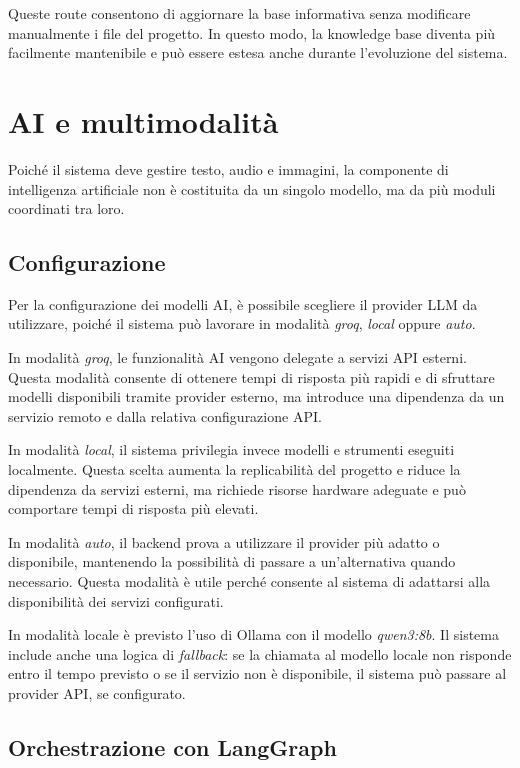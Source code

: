 Queste route consentono di aggiornare la base informativa senza modificare manualmente i file del progetto. In questo modo, la knowledge base diventa più facilmente mantenibile e può essere estesa anche durante l’evoluzione del sistema.

\section{AI e multimodalità}

Poiché il sistema deve gestire testo, audio e immagini, la componente di intelligenza artificiale non è costituita da un singolo modello, ma da più moduli coordinati tra loro.

\subsection*{Configurazione}

Per la configurazione dei modelli AI, è possibile scegliere il provider LLM da utilizzare, poiché il sistema può lavorare in modalità \textit{groq}, \textit{local} oppure \textit{auto}.

In modalità \textit{groq}, le funzionalità AI vengono delegate a servizi API esterni. Questa modalità consente di ottenere tempi di risposta più rapidi e di sfruttare modelli disponibili tramite provider esterno, ma introduce una dipendenza da un servizio remoto e dalla relativa configurazione API.

In modalità \textit{local}, il sistema privilegia invece modelli e strumenti eseguiti localmente. Questa scelta aumenta la replicabilità del progetto e riduce la dipendenza da servizi esterni, ma richiede risorse hardware adeguate e può comportare tempi di risposta più elevati.

In modalità \textit{auto}, il backend prova a utilizzare il provider più adatto o disponibile, mantenendo la possibilità di passare a un’alternativa quando necessario. Questa modalità è utile perché consente al sistema di adattarsi alla disponibilità dei servizi configurati.

In modalità locale è previsto l’uso di Ollama con il modello \textit{qwen3:8b}. Il sistema include anche una logica di \textit{fallback}: se la chiamata al modello locale non risponde entro il tempo previsto o se il servizio non è disponibile, il sistema può passare al provider API, se configurato.

\subsection*{Orchestrazione con LangGraph}

